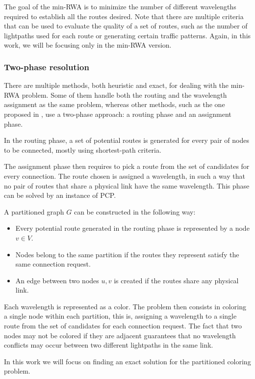 The goal of the min-RWA is to minimize the number of different wavelengths required to establish all the routes desired. Note that there are multiple criteria that can be used to evaluate the quality of a set of routes, such as the number of lightpaths used for each route or generating certain traffic patterns. Again, in this work, we will be focusing only in the min-RWA version.

\subsubsection*{Two-phase resolution}

There are multiple methods, both heuristic and exact, for dealing with the min-RWA problem. Some of them handle both the routing and the wavelength assignment as the same problem, whereas other methods, such as the one proposed in \cite{Li00thepartition}, use a two-phase approach: a routing phase and an assignment phase.

In the routing phase, a set of potential routes is generated for every pair of nodes to be connected, mostly using shortest-path criteria.

The assignment phase then requires to pick a route from the set of candidates for every connection. The route chosen is assigned a wavelength, in such a way that no pair of routes that share a physical link have the same wavelength. This phase can be solved by an instance of PCP.

A partitioned graph $G$ can be constructed in the following way:
\begin{itemize}
\item{Every potential route generated in the routing phase is represented by a node $v \in V$.}
\item{Nodes belong to the same partition if the routes they represent satisfy the same connection request.}
\item{An edge between two nodes $u,v$ is created if the routes share any physical link.}
\end{itemize}

Each wavelength is represented as a color. The problem then consists in coloring a single node within each partition, this is, assigning a wavelength to a single route from the set of candidates for each connection request. The fact that two nodes may not be colored if they are adjacent guarantees  that no wavelength conflicts may occur between two different lightpaths in the same link.

In this work we will focus on finding an exact solution for the partitioned coloring problem.

